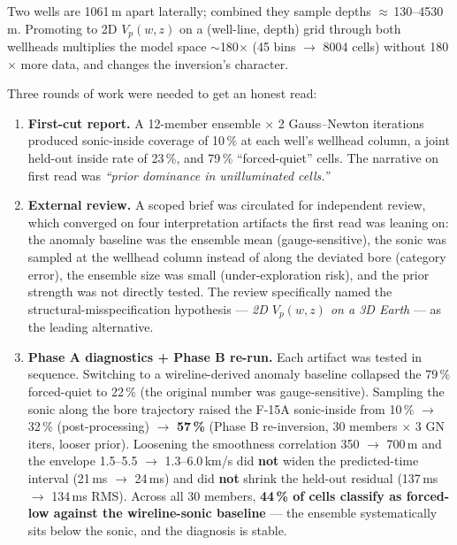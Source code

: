 \documentclass[11pt]{article}
\begin{document}
Two wells are 1061\,m apart laterally; combined they sample depths
$\approx$\,130--4530\,m. Promoting to 2D $V_p(w, z)$ on a (well-line,
depth) grid through both wellheads multiplies the model space $\sim$180$\times$
(45 bins $\rightarrow$ 8004 cells) without 180$\times$ more data, and
changes the inversion's character.

Three rounds of work were needed to get an honest read:

\begin{enumerate}
\item \textbf{First-cut report.} A 12-member ensemble $\times$ 2
  Gauss--Newton iterations produced sonic-inside coverage of 10\,\% at each
  well's wellhead column, a joint held-out inside rate of 23\,\%, and 79\,\%
  ``forced-quiet'' cells. The narrative on first read was \emph{``prior
  dominance in unilluminated cells.''}
\item \textbf{External review.} A scoped brief was circulated for
  independent review, which converged on four interpretation artifacts the
  first read was leaning on: the anomaly baseline was the ensemble mean
  (gauge-sensitive), the sonic was sampled at the wellhead column instead
  of along the deviated bore (category error), the ensemble size was small
  (under-exploration risk), and the prior strength was not directly
  tested. The review specifically named the structural-misspecification
  hypothesis --- \emph{2D $V_p(w, z)$ on a 3D Earth} --- as the leading
  alternative.
\item \textbf{Phase A diagnostics + Phase B re-run.} Each artifact was
  tested in sequence. Switching to a wireline-derived anomaly baseline
  collapsed the 79\,\% forced-quiet to 22\,\% (the original number was
  gauge-sensitive). Sampling the sonic along the bore trajectory raised the
  F-15A sonic-inside from 10\,\% $\rightarrow$ 32\,\% (post-processing)
  $\rightarrow$ \textbf{57\,\%} (Phase B re-inversion, 30 members $\times$
  3 GN iters, looser prior). Loosening the smoothness correlation
  350 $\rightarrow$ 700\,m and the envelope 1.5--5.5 $\rightarrow$
  1.3--6.0\,km/s did \textbf{not} widen the predicted-time interval
  (21\,ms $\rightarrow$ 24\,ms) and did \textbf{not} shrink the held-out
  residual (137\,ms $\rightarrow$ 134\,ms RMS). Across all 30 members,
  \textbf{44\,\% of cells classify as forced-low against the wireline-sonic
  baseline} --- the ensemble systematically sits below the sonic, and the
  diagnosis is stable.
\end{enumerate}
\end{document}
